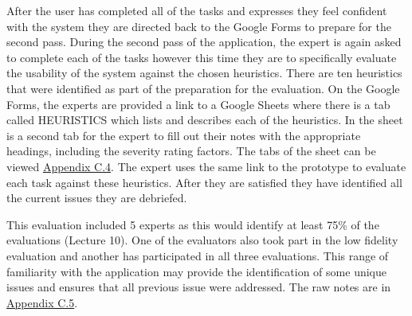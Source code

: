 \documentclass[a4 paper, 12pt]{article}
\begin{document}
    After the user has completed all of the tasks and expresses they feel confident with the system they are directed back to the Google Forms to prepare for the second pass. During the second pass of the application, the expert is again asked to complete each of the tasks however this time they are to specifically evaluate the usability of the system against the chosen heuristics. There are ten heuristics that were identified as part of the preparation for the evaluation. On the Google Forms, the experts are provided a link to a Google Sheets where there is a tab called HEURISTICS which lists and describes each of the heuristics. In the sheet is a second tab for the expert to fill out their notes with the appropriate headings, including the severity rating factors. The tabs of the sheet can be viewed \hyperref[sec:C.4]{Appendix C.4}. The expert uses the same link to the prototype to evaluate each task against these heuristics. After they are satisfied they have identified all the current issues they are debriefed.
    
    This evaluation included 5 experts as this would identify at least 75\% of the evaluations (Lecture 10). One of the evaluators also took part in the low fidelity evaluation and another has participated in all three evaluations. This range of familiarity with the application may provide the identification of some unique issues and ensures that all previous issue were addressed. The raw notes are in \hyperref[sec:C.5]{Appendix C.5}. 
\end{document}

